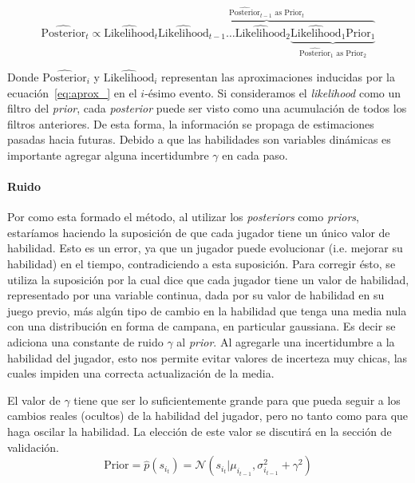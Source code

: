 \documentclass[11pt,twoside,spanish]{report} %
\newcommand{\N}{\mathcal{N}}
\begin{document}
\begin{equation}
 \widehat{\text{Posterior}}_t \propto \widehat{\text{Likelihood}}_t  \overbrace{\widehat{\text{Likelihood}}_{t-1} \dots \widehat{\text{Likelihood}}_{2} \underbrace{\widehat{\text{Likelihood}}_{1} \text{Prior}_1}_{\widehat{\text{Posterior}}_{1} \text{ as } \text{Prior}_{2}} }^{\widehat{\text{Posterior}}_{t-1} \text{ as } \text{Prior}_{t}} 
\end{equation}

Donde {\footnotesize $\widehat{\text{Posterior}}_i$} y {\footnotesize $\widehat{\text{Likelihood}}_i$} representan las aproximaciones inducidas por la ecuaci\'on~\ref{eq:aprox_} en el $i$-\'esimo evento.
Si consideramos el \textit{likelihood} como un filtro del \textit{prior}, cada \textit{posterior} puede ser visto como una acumulaci\'on de todos los filtros anteriores.
De esta forma, la informaci\'on se propaga de estimaciones pasadas hacia futuras.
Debido a que las habilidades son variables din\'amicas es importante agregar alguna incertidumbre $\gamma$ en cada paso.



\paragraph{Ruido}
Por como esta formado el m\'etodo, al utilizar los \textit{posteriors} como \textit{priors}, estar\'iamos haciendo la suposici\'on de que cada jugador tiene un \'unico valor de habilidad.
Esto es un error, ya que un jugador puede evolucionar (i.e. mejorar su habilidad) en el tiempo, contradiciendo a esta suposici\'on.
Para corregir \'esto, se utiliza la suposici\'on por la cual dice que cada jugador tiene un valor de habilidad, representado por una variable continua, dada por su valor de habilidad en su juego previo, m\'as alg\'un tipo de cambio en la habilidad que tenga una media nula con una distribuci\'on en forma de campana, en particular gaussiana.
Es decir se adiciona una constante de ruido $\gamma$ al \textit{prior}.
Al agregarle una incertidumbre a la habilidad del jugador, esto nos permite evitar valores de incerteza muy chicas, las cuales impiden una correcta actualizaci\'on de la media.

El valor de  $\gamma$ tiene que ser lo suficientemente grande para que pueda seguir a los cambios reales (ocultos) de la habilidad del jugador, pero no tanto como para que haga oscilar la habilidad.
La elecci\'on de este valor se discutir\'a en la secci\'on de validaci\'on.
\begin{equation}
	\text{Prior}= \widehat{p}(s_{i_t}) = \N(s_{i_t} | \mu_{i_{t-1}}, \sigma_{i_{t-1}}^2 + \gamma^2 )
\end{equation}
\end{document}
